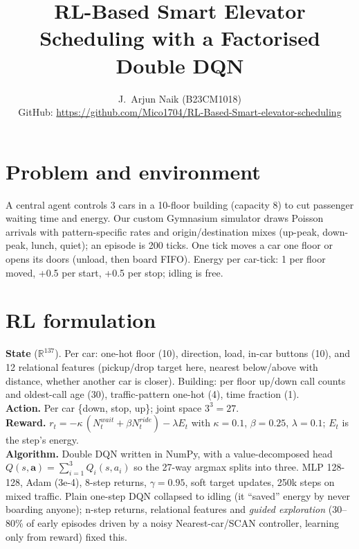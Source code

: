 \documentclass[10pt,twocolumn]{article}
\title{\vspace{-1.2em}RL-Based Smart Elevator Scheduling with a Factorised Double DQN}
\author{J.\ Arjun Naik (B23CM1018)\\GitHub: \url{https://github.com/Mico1704/RL-Based-Smart-elevator-scheduling}}
\date{}
\begin{document}
\maketitle\vspace{-1.6em}
\section{Problem and environment}
A central agent controls 3 cars in a 10-floor building (capacity 8) to cut passenger waiting time and energy. Our custom Gymnasium simulator draws Poisson arrivals with pattern-specific rates and origin/destination mixes (up-peak, down-peak, lunch, quiet); an episode is 200 ticks. One tick moves a car one floor or opens its doors (unload, then board FIFO). Energy per car-tick: 1 per floor moved, +0.5 per start, +0.5 per stop; idling is free.
\section{RL formulation}
\textbf{State} ($\mathbb{R}^{137}$). Per car: one-hot floor (10), direction, load, in-car buttons (10), and 12 relational features (pickup/drop target here, nearest below/above with distance, whether another car is closer). Building: per floor up/down call counts and oldest-call age (30), traffic-pattern one-hot (4), time fraction (1).\\
\textbf{Action.} Per car \{down, stop, up\}; joint space $3^3=27$.\\
\textbf{Reward.} $r_t=-\kappa\,(N^{wait}_t+\beta N^{ride}_t)-\lambda E_t$ with $\kappa=0.1$, $\beta=0.25$, $\lambda=0.1$; $E_t$ is the step's energy.\\
\textbf{Algorithm.} Double DQN written in NumPy, with a value-decomposed head $Q(s,\mathbf a)=\sum_{i=1}^{3}Q_i(s,a_i)$ so the 27-way argmax splits into three. MLP 128-128, Adam (3e-4), 8-step returns, $\gamma=0.95$, soft target updates, 250k steps on mixed traffic. Plain one-step DQN collapsed to idling (it ``saved'' energy by never boarding anyone); n-step returns, relational features and \emph{guided exploration} (30--80\% of early episodes driven by a noisy Nearest-car/SCAN controller, learning only from reward) fixed this.
\end{document}
